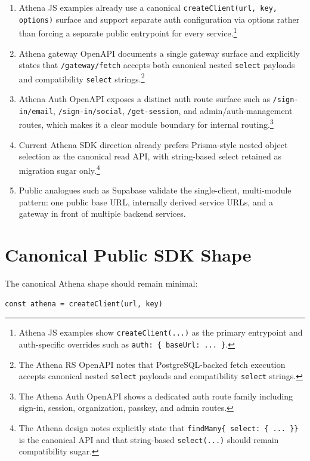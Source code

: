 \documentclass[11pt]{article}
\begin{document}
\begin{enumerate}[leftmargin=1.5em]
  \item Athena JS examples already use a canonical \texttt{createClient(url, key, options)} surface and support separate auth configuration via options rather than forcing a separate public entrypoint for every service.\footnote{Athena JS examples show \texttt{createClient(...)} as the primary entrypoint and auth-specific overrides such as \texttt{auth: \{ baseUrl: ... \}}.}
  \item Athena gateway OpenAPI documents a single gateway surface and explicitly states that \texttt{/gateway/fetch} accepts both canonical nested \texttt{select} payloads and compatibility \texttt{select} strings.\footnote{The Athena RS OpenAPI notes that PostgreSQL-backed fetch execution accepts canonical nested \texttt{select} payloads and compatibility \texttt{select} strings.}
  \item Athena Auth OpenAPI exposes a distinct auth route surface such as \texttt{/sign-in/email}, \texttt{/sign-in/social}, \texttt{/get-session}, and admin/auth-management routes, which makes it a clear module boundary for internal routing.\footnote{The Athena Auth OpenAPI shows a dedicated auth route family including sign-in, session, organization, passkey, and admin routes.}
  \item Current Athena SDK direction already prefers Prisma-style nested object selection as the canonical read API, with string-based select retained as migration sugar only.\footnote{The Athena design notes explicitly state that \texttt{findMany\{ select: \{ ... \}\}} is the canonical API and that string-based \texttt{select(...)} should remain compatibility sugar.}
  \item Public analogues such as Supabase validate the single-client, multi-module pattern: one public base URL, internally derived service URLs, and a gateway in front of multiple backend services.
\end{enumerate}

\section{Canonical Public SDK Shape}

The canonical Athena shape should remain minimal:

\begin{lstlisting}[language=TypeScriptAthena]
const athena = createClient(url, key)
\end{lstlisting}
\end{document}

